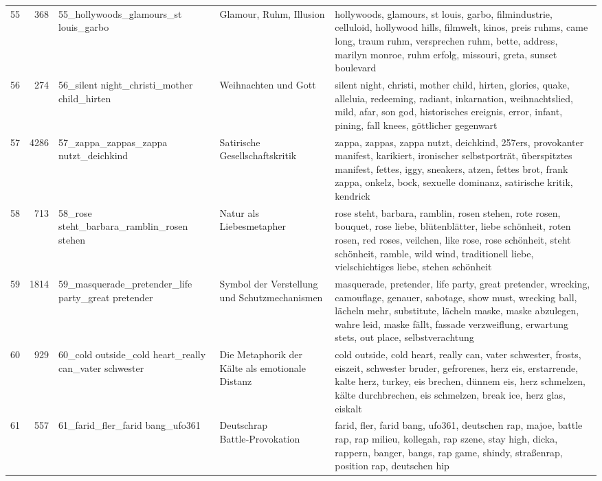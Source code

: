 \begin{longtable}{rrlll}
55 & 368 & 55\_hollywoods\_glamours\_st louis\_garbo & Glamour, Ruhm, Illusion & hollywoods, glamours, st louis, garbo, filmindustrie, celluloid, hollywood hills, filmwelt, kinos, preis ruhms, came long, traum ruhm, versprechen ruhm, bette, address, marilyn monroe, ruhm erfolg, missouri, greta, sunset boulevard \\
56 & 274 & 56\_silent night\_christi\_mother child\_hirten & Weihnachten und Gott & silent night, christi, mother child, hirten, glories, quake, alleluia, redeeming, radiant, inkarnation, weihnachtslied, mild, afar, son god, historisches ereignis, error, infant, pining, fall knees, göttlicher gegenwart \\
57 & 4286 & 57\_zappa\_zappas\_zappa nutzt\_deichkind & Satirische Gesellschaftskritik & zappa, zappas, zappa nutzt, deichkind, 257ers, provokanter manifest, karikiert, ironischer selbstporträt, überspitztes manifest, fettes, iggy, sneakers, atzen, fettes brot, frank zappa, onkelz, bock, sexuelle dominanz, satirische kritik, kendrick \\
58 & 713 & 58\_rose steht\_barbara\_ramblin\_rosen stehen & Natur als Liebesmetapher & rose steht, barbara, ramblin, rosen stehen, rote rosen, bouquet, rose liebe, blütenblätter, liebe schönheit, roten rosen, red roses, veilchen, like rose, rose schönheit, steht schönheit, ramble, wild wind, traditionell liebe, vielschichtiges liebe, stehen schönheit \\
59 & 1814 & 59\_masquerade\_pretender\_life party\_great pretender & Symbol der Verstellung und Schutzmechanismen & masquerade, pretender, life party, great pretender, wrecking, camouflage, genauer, sabotage, show must, wrecking ball, lächeln mehr, substitute, lächeln maske, maske abzulegen, wahre leid, maske fällt, fassade verzweiflung, erwartung stets, out place, selbstverachtung \\
60 & 929 & 60\_cold outside\_cold heart\_really can\_vater schwester & Die Metaphorik der Kälte als emotionale Distanz & cold outside, cold heart, really can, vater schwester, frosts, eiszeit, schwester bruder, gefrorenes, herz eis, erstarrende, kalte herz, turkey, eis brechen, dünnem eis, herz schmelzen, kälte durchbrechen, eis schmelzen, break ice, herz glas, eiskalt \\
61 & 557 & 61\_farid\_fler\_farid bang\_ufo361 & Deutschrap Battle‑Provokation & farid, fler, farid bang, ufo361, deutschen rap, majoe, battle rap, rap milieu, kollegah, rap szene, stay high, dicka, rappern, banger, bangs, rap game, shindy, straßenrap, position rap, deutschen hip \\

\end{longtable}
